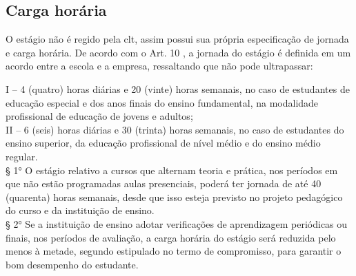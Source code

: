 \subsection{Carga horária}
O estágio não é regido pela \ac{clt}, assim possui sua própria especificação de jornada e carga horária. De acordo com o Art. 10 \cite{leiestagio}, a jornada do estágio é definida em um acordo entre a escola e a empresa, ressaltando que não pode ultrapassar:
\begin{quoting}[rightmargin=0cm,leftmargin=4cm]
	\begin{SingleSpace}
	{\footnotesize
	I – 4 (quatro) horas diárias e 20 (vinte) horas semanais, no caso de estudantes de educação especial e dos anos finais do ensino fundamental, na modalidade profissional de educação de jovens e adultos;\\II – 6 (seis) horas diárias e 30 (trinta) horas semanais, no caso de estudantes do ensino superior, da educação profissional de nível médio e do ensino médio regular.\\§ 1°  O estágio relativo a cursos que alternam teoria e prática, nos períodos em que não estão programadas aulas presenciais, poderá ter jornada de até 40 (quarenta) horas semanais, desde que isso esteja previsto no projeto pedagógico do curso e da instituição de ensino. \\§ 2°  Se a instituição de ensino adotar verificações de aprendizagem periódicas ou finais, nos períodos de avaliação, a carga horária do estágio será reduzida pelo menos à metade, segundo estipulado no termo de compromisso, para garantir o bom desempenho do estudante.\cite{leiestagio}
	}
	\end{SingleSpace}
\end{quoting}
